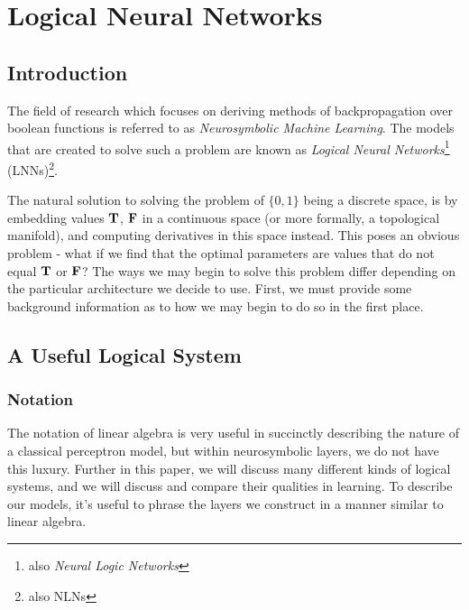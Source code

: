 \documentclass[conference]{report}
\begin{document}
\chapter{Logical Neural Networks}

\section{Introduction}

The field of research which focuses on deriving methods of backpropagation over boolean functions is referred to as \textit{Neurosymbolic Machine Learning}. The models that are created to solve such a problem are known as \textit{Logical Neural Networks}\footnote{also \textit{Neural Logic Networks}} (LNNs)\footnote{also NLNs}. 

The natural solution to solving the problem of $\{0,1\}$ being a discrete space, is by embedding values $\textbf{T}$, $\textbf{F}$ in a continuous space (or more formally, a topological manifold), and computing derivatives in this space instead. This poses an obvious problem - what if we find that the optimal parameters are values that do not equal $\textbf{T}$ or $\textbf{F}$? The ways we may begin to solve this problem differ depending on the particular architecture we decide to use. First, we must provide some background information as to how we may begin to do so in the first place.



\section{A Useful Logical System}

\subsection{Notation}

The notation of linear algebra is very useful in succinctly describing the nature of a classical perceptron model, but within neurosymbolic layers, we do not have this luxury. Further in this paper, we will discuss many different kinds of logical systems, and we will discuss and compare their qualities in learning. To describe our models, it's useful to phrase the layers we construct in a manner similar to linear algebra.
\end{document}

